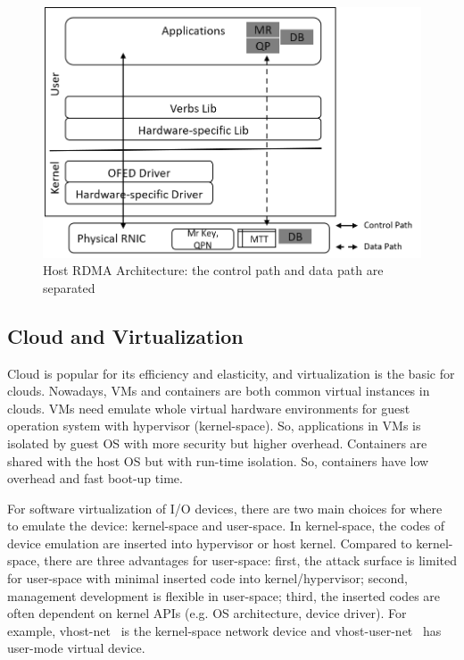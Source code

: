 \begin{figure}[!ht]
\centering
\includegraphics[width=0.8\linewidth]{images/rdma-feat.png}
\caption{Host RDMA Architecture: the control path and data path are separated}
\label{fig:rdma-feat}
\end{figure}


\subsection{Cloud and Virtualization}
Cloud is popular for its efficiency and elasticity, and virtualization is the basic for clouds. Nowadays, VMs and containers are both common virtual instances in clouds. VMs need emulate whole virtual hardware environments for guest operation system with hypervisor (kernel-space). So, applications in VMs is isolated by guest OS with more security but higher overhead. Containers are shared with the host OS but with run-time isolation. So, containers have low overhead and fast boot-up time.

For software virtualization of I/O devices, there are two main choices for where to emulate the device: kernel-space and user-space. In kernel-space, the codes of device emulation are inserted into hypervisor or host kernel. Compared to kernel-space, there are three advantages for user-space: first, the attack surface is limited for user-space with minimal inserted code into kernel/hypervisor; second, management development is flexible in user-space; third, the inserted codes are often dependent on kernel APIs (e.g. OS architecture, device driver). For example, vhost-net~\cite{vhost-net} is the kernel-space network device and vhost-user-net~\cite{vhost-user-net} has user-mode virtual device. 


